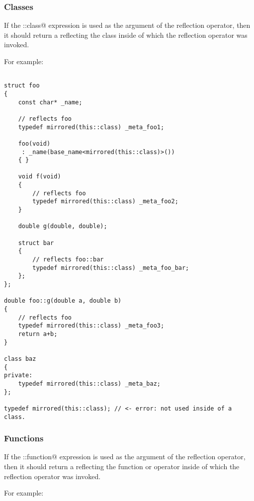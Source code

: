 \subsubsection{Classes}

If the \verb@this::class@ expression is used as the argument of the reflection
operator, then it should return a  reflecting the class
inside of which the reflection operator was invoked.

For example:

\begin{verbatim}

struct foo
{
	const char* _name;

	// reflects foo
	typedef mirrored(this::class) _meta_foo1;

	foo(void)
	 : _name(base_name<mirrored(this::class)>())
	{ }

	void f(void)
	{
		// reflects foo
		typedef mirrored(this::class) _meta_foo2;
	}

	double g(double, double);

	struct bar
	{
		// reflects foo::bar
		typedef mirrored(this::class) _meta_foo_bar;
	};
};

double foo::g(double a, double b)
{
	// reflects foo
	typedef mirrored(this::class) _meta_foo3;
	return a+b;
}

class baz
{
private:
	typedef mirrored(this::class) _meta_baz;
};

typedef mirrored(this::class); // <- error: not used inside of a class.

\end{verbatim}

\subsubsection{Functions}

If the \verb@this::function@ expression is used as the argument of the reflection
operator, then it should return a  reflecting the function or operator
inside of which the reflection operator was invoked.

For example:

